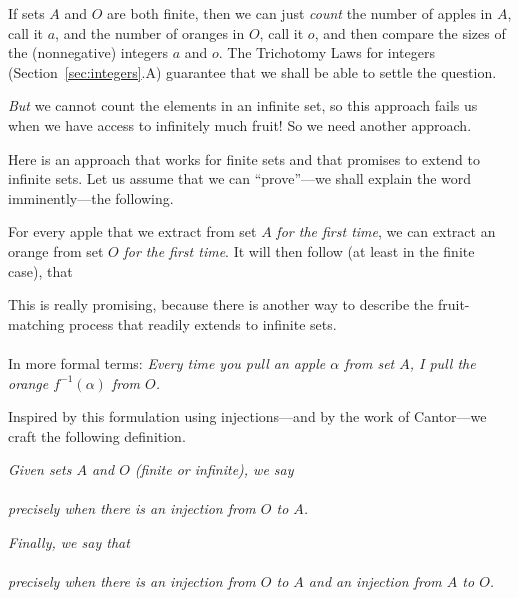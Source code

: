 \medskip

If sets $A$ and $O$ are both finite, then we can just {\em count} the
number of apples in $A$, call it $a$, and the number of oranges in
$O$, call it $o$, and then compare the sizes of the (nonnegative)
integers $a$ and $o$.  The Trichotomy Laws for integers
(Section~\ref{sec:integers}.A) guarantee that we shall be able to
settle the question.

\noindent
{\em But} we cannot count the elements in an infinite set, so this
approach fails us when we have access to infinitely much fruit!  So we
need another approach.

\medskip

Here is an approach that works for finite sets and that promises to
extend to infinite sets.  Let us assume that we can ``prove''---we
shall explain the word imminently---the following.

For every apple that we extract from set $A$ {\em for the first time},
we can extract an orange from set $O$ {\em for the first time}.  It
will then follow (at least in the finite case), that \\
\hspace*{.35in}{\em There are at least as many oranges as apples!}

\noindent
This is really promising, because there is another way to describe the
fruit-matching process that readily extends to infinite sets.  \\
 \\
In more formal terms: {\em Every time you pull an apple $\alpha$ from set
  $A$, I pull the orange $f^{-1}(\alpha)$ from $O$.}

\medskip

Inspired by this formulation using injections---and by the work of
Cantor---we craft the following definition.

\noindent
{\em
Given sets $A$ and $O$ (finite or infinite), we say \\
\hspace*{.35in}{\em Set $O$ is at least as big as set $A$, denoted
  $|O| \geq |A|$} \\
precisely when there is an injection from $O$ to $A$.}

\noindent
{\em
Finally, we say that \\
\hspace*{.35in}{\em Sets $O$ and $A$ have the same cardinality,
  denoted $|O| = |A|$} \\
precisely when there is an injection from $O$ to $A$ {\em and} an
injection from $A$ to $O$.}

